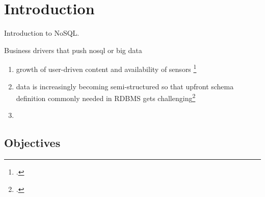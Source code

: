\newpage

\listoftables
{}
\newpage


\listoffigures
{}
\newpage

\listoflistings
{}
\newpage

\renewcommand{\thepage}{\arabic{page}}

\setcounter{page}{1} 


\section{Introduction}
\label{sec:introduction}

Introduction to NoSQL.

Business drivers that push nosql or big data
\begin{enumerate}
  \item growth of user-driven content and availability of sensors
  \footcite[Cf.][XVII]{Tiwari_2011}
  \item data is increasingly becoming semi-structured so that upfront schema
  definition commonly needed in RDBMS gets
  challenging\footcite[Cf.][XVII]{Tiwari_2011}
  \item 
\end{enumerate}



\subsection{Objectives}
\label{sec:objectives}

